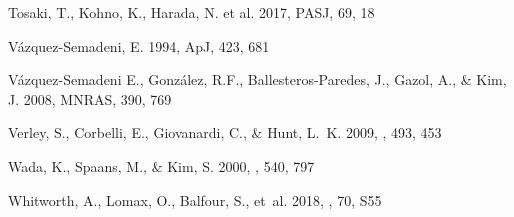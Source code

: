 \documentclass{aa}
\begin{document}
\begin{thebibliography}{}
 Tosaki, T., Kohno, K., Harada, N. et al. 2017,
    PASJ, 69, 18

 V\'azquez-Semadeni, E. 1994, ApJ, 423, 681

 V\'azquez-Semadeni E., Gonz\'alez,
    R.F., Ballesteros-Paredes, J., Gazol, A., \& Kim, J. 2008, MNRAS, 390, 769

{Verley}, S., {Corbelli}, E., {Giovanardi}, C., \& {Hunt}, L.~K. 2009, \aap,
  493, 453

{Wada}, K., {Spaans}, M., \& {Kim}, S. 2000, \apj, 540, 797

{Whitworth}, A., {Lomax}, O., {Balfour}, S., {et~al.} 2018, \pasj, 70, S55


\end{thebibliography}
 
\end{document}
